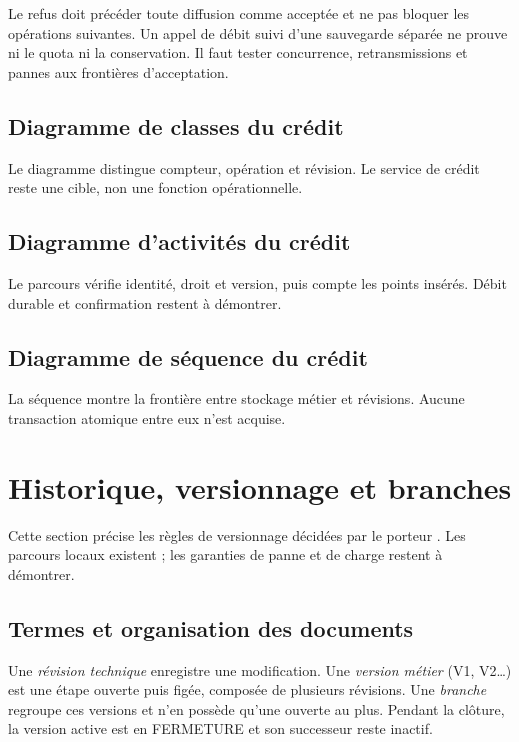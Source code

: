 Le refus doit précéder toute diffusion comme acceptée et ne pas bloquer les opérations suivantes. Un appel de débit suivi d'une sauvegarde séparée ne prouve ni le quota ni la conservation. Il faut tester concurrence, retransmissions et pannes aux frontières d'acceptation.

\subsection{Diagramme de classes du crédit}
Le diagramme distingue compteur, opération et révision. Le service de crédit reste une cible, non une fonction opérationnelle.

\subsection{Diagramme d'activités du crédit}
Le parcours vérifie identité, droit et version, puis compte les points insérés. Débit durable et confirmation restent à démontrer.

\subsection{Diagramme de séquence du crédit}
La séquence montre la frontière entre stockage métier et révisions. Aucune transaction atomique entre eux n'est acquise.

\section{Historique, versionnage et branches}\label{sec:conception-historique}

Cette section précise les règles de versionnage décidées par le porteur \cite{decisions-porteur}. Les parcours locaux existent ; les garanties de panne et de charge restent à démontrer.

\subsection{Termes et organisation des documents}

Une \emph{révision technique} enregistre une modification. Une \emph{version métier} (V1, V2…) est une étape ouverte puis figée, composée de plusieurs révisions. Une \emph{branche} regroupe ces versions et n'en possède qu'une ouverte au plus. Pendant la clôture, la version active est en FERMETURE et son successeur reste inactif.

